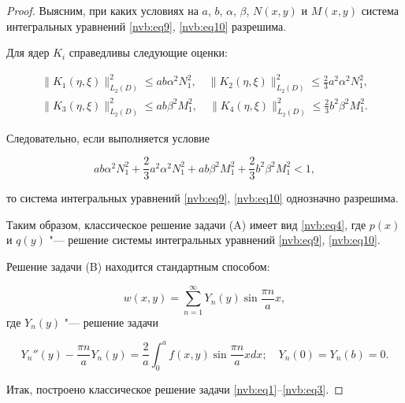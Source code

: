 \begin{proof}
Выясним, при каких условиях на $a$, $b$, $\alpha$, $\beta$, $N(x,y)$ и $ M(x,y) $ система интегральных уравнений \eqref{nvb:eq9}, \eqref{nvb:eq10} разрешима.







Для ядер $K_i$ справедливы следующие оценки:

\begin{gather*}

\textstyle

 \| K_1(\eta,\xi)\|^2_{L_2(D)}\leq ab\alpha^2N^2_1,\quad \| K_2(\eta,\xi)\|^2_{L_2(D)}\leq \frac{2}{3}a^2\alpha^2N^2_1,

\\

\textstyle

 \| K_3(\eta,\xi)\|^2_{L_2(D)}\leq ab\beta^2M^2_1, \quad \| K_4(\eta,\xi)\|^2_{L_2(D)}\leq \frac{2}{3}b^2\beta^2M^2_1.

\end{gather*}

 

Следовательно, если выполняется условие 

\begin{equation*}

\textstyle

 ab\alpha^2N^2_1+\frac{2}{3}a^2\alpha^2N^2_1+ab\beta^2M^2_1+\frac{2}{3}b^2\beta^2M^2_1<1,

\end{equation*}

то система интегральных уравнений \eqref{nvb:eq9}, \eqref{nvb:eq10} однозначно разрешима. 



Таким образом, классическое решение задачи (A) имеет вид \eqref{nvb:eq4}, где $p(x)$ и $q(y)$ "--- решение системы интегральных уравнений \eqref{nvb:eq9}, \eqref{nvb:eq10}.



Решение задачи (B) находится стандартным способом:



$$w(x,y)=\sum\limits_{n=1}^\infty Y_n(y)\sin\frac{\pi n}{a}x,$$ где $Y_n(y)$ "--- решение задачи

\begin{equation*}

 Y_n''(y)-\frac{\pi n}{a}Y_n(y)=\frac{2}{a}\int_0^a f(x,y)\sin\frac{\pi n}{a}x dx;\quad 

 Y_n(0)=Y_n(b)=0.

\end{equation*}



Итак, построено классическое решение задачи \eqref{nvb:eq1}--\eqref{nvb:eq3}.

\end{proof}

